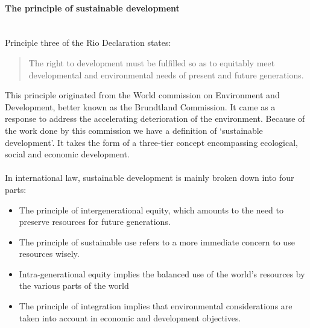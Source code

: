 \documentclass[../summary.tex]{subfiles}
\begin{document}
			\paragraph{The principle of sustainable development}\mbox{}\\
				\label{par:13-princ-sus-dev}
				Principle three of the Rio Declaration states:
				\begin{quote}
					The right to development must be fulfilled so as to equitably meet developmental and environmental needs of present and future generations. 
				\end{quote}
				This principle originated from the World commission on Environment and Development, better known as the Brundtland Commission. It came as a response to address the accelerating deterioration of the environment. Because of the work done by this commission we have a definition of `sustainable development'. It takes the form of a three-tier concept encompassing ecological, social and economic development.\\
				\\
				In international law, sustainable development is mainly broken down into four parts:
				\begin{itemize}
					\item The principle of intergenerational equity, which amounts to the need to preserve resources for future generations. 
					\item The principle of sustainable use refers to a more immediate concern to use resources wisely.
					\item Intra-generational equity implies the balanced use of the world's resources by the various parts of the world
					\item The principle of integration implies that environmental considerations are taken into account in economic and development objectives. 
				\end{itemize}
				\newpage
				
\end{document}
